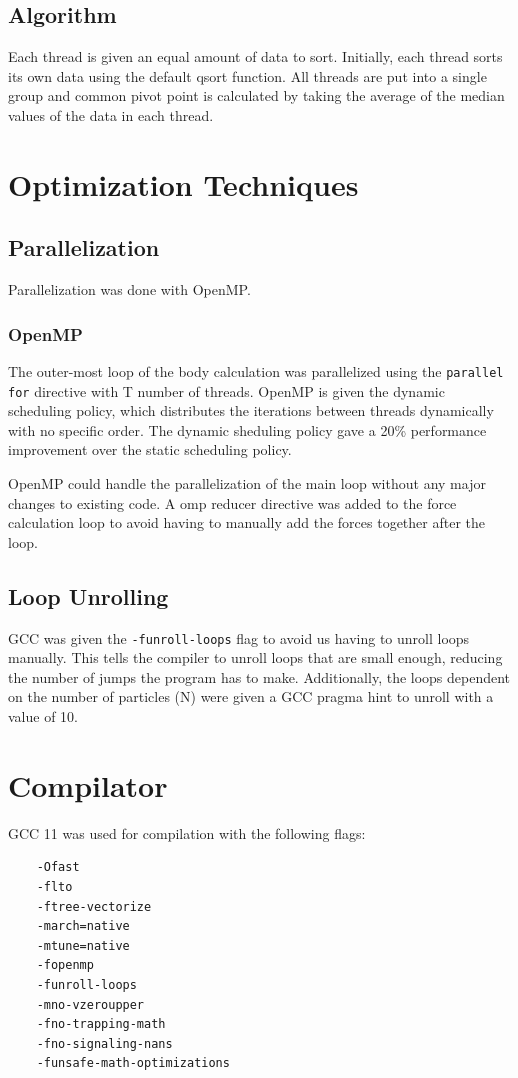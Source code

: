 \documentclass{report}
\begin{document}
\subsection{Algorithm}
Each thread is given an equal amount of data to sort. Initially, each thread sorts its own data using the default qsort function. 
All threads are put into a single group and common pivot point is calculated by taking the average of the median values of the data in each thread.
\section{Optimization Techniques}
\subsection{Parallelization}
Parallelization was done with OpenMP. 

\subsubsection{OpenMP}
The outer-most loop of the body calculation was parallelized using the \texttt{parallel for} directive with T number of threads. OpenMP is given the dynamic scheduling policy, which distributes the iterations between threads dynamically with no specific order.
The dynamic sheduling policy gave a 20\% performance improvement over the static scheduling policy. 

OpenMP could handle the parallelization of the main loop without any major changes to existing code. A omp reducer directive was added to the force calculation loop to avoid having to manually add the forces together after the loop.


\subsection{Loop Unrolling}
GCC was given the \texttt{-funroll-loops} flag to avoid us having to unroll loops manually. This tells the compiler to unroll loops that are small enough, reducing the number of jumps the program has to make. Additionally, the loops dependent on the number of particles (N) were given a GCC pragma hint to unroll with a value of 10.


\section{Compilator}
GCC 11 was used for compilation with the following flags:
\begin{lstlisting}
    -Ofast 
    -flto 
    -ftree-vectorize 
    -march=native 
    -mtune=native
    -fopenmp 
    -funroll-loops  
    -mno-vzeroupper 
    -fno-trapping-math 
    -fno-signaling-nans 
    -funsafe-math-optimizations
\end{lstlisting}
\end{document}
